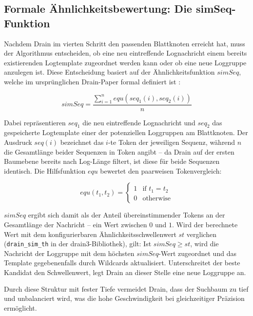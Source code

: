 \subsection{Formale Ähnlichkeitsbewertung: Die simSeq-Funktion}

Nachdem Drain im vierten Schritt den passenden Blattknoten erreicht hat, muss der 
Algorithmus entscheiden, ob eine neu eintreffende Lognachricht einem bereits 
existierenden Logtemplate zugeordnet werden kann oder ob eine neue Loggruppe 
anzulegen ist. Diese Entscheidung basiert auf der Ähnlichkeitsfunktion 
$simSeq$, welche im ursprünglichen Drain-Paper formal definiert ist
\cite[Abschn.~III.E]{drain}:

\begin{equation}
    simSeq = \frac{\sum_{i=1}^{n} equ(seq_1(i), seq_2(i))}{n}
    \label{eq:simseq}
\end{equation}

Dabei repräsentieren $seq_1$ die neu eintreffende Lognachricht und $seq_2$ das
gespeicherte Logtemplate einer der potenziellen Loggruppen am Blattknoten. Der Ausdruck $seq(i)$ bezeichnet
das $i$-te Token der jeweiligen Sequenz, während $n$ die Gesamtlänge beider 
Sequenzen in Token angibt – da Drain auf der ersten Baumebene bereits nach 
Log-Länge filtert, ist diese für beide Sequenzen identisch. Die Hilfsfunktion 
$equ$ bewertet den paarweisen Tokenvergleich:

\begin{equation}
    equ(t_1, t_2) = \begin{cases} 1 & \text{if } t_1 = t_2 \\ 0 & \text{otherwise} \end{cases}
    \label{eq:equ}
\end{equation}

$simSeq$ ergibt sich damit als der Anteil übereinstimmender Tokens an der 
Gesamtlänge der Nachricht – ein Wert zwischen $0$ und $1$. Wird der berechnete 
Wert mit dem konfigurierbaren Ähnlichkeitsschwellenwert $st$ verglichen 
(\lstinline{drain_sim_th} in der drain3-Bibliothek), gilt: Ist 
$simSeq \geq st$, wird die Nachricht der Loggruppe mit dem höchsten
$simSeq$-Wert zugeordnet und das Template gegebenenfalls durch Wildcards
aktualisiert. Unterschreitet der beste Kandidat den Schwellenwert, legt Drain 
an dieser Stelle eine neue Loggruppe an.

Durch diese Struktur mit fester Tiefe vermeidet Drain, dass der Suchbaum zu tief und unbalanciert wird, was die hohe Geschwindigkeit bei gleichzeitiger Präzision ermöglicht.

